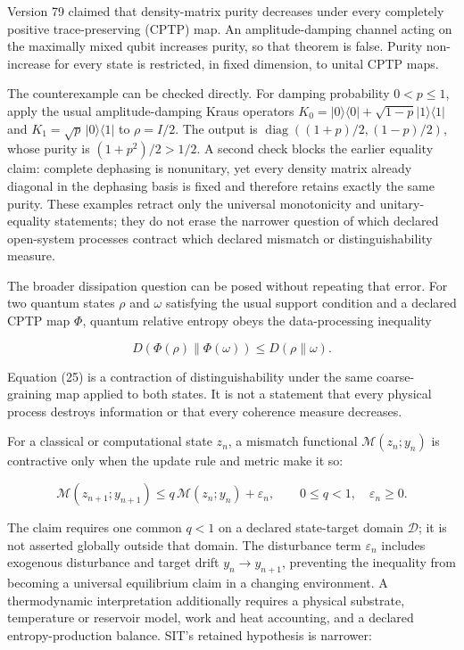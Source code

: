 \documentclass[
  american,
  11pt,
  letterpaper,
]{article}
\begin{document}
Version 79 claimed that density-matrix purity decreases under every completely positive trace-preserving (CPTP) map. An amplitude-damping channel acting on the maximally mixed qubit increases purity, so that theorem is false. Purity non-increase for every state is restricted, in fixed dimension, to unital CPTP maps.

The counterexample can be checked directly. For damping probability \(0<p\leq1\), apply the usual amplitude-damping Kraus operators \(K_0=|0\rangle\langle0|+\sqrt{1-p}|1\rangle\langle1|\) and \(K_1=\sqrt p\,|0\rangle\langle1|\) to \(\rho=I/2\). The output is \(\operatorname{diag}((1+p)/2,(1-p)/2)\), whose purity is \((1+p^2)/2>1/2\). A second check blocks the earlier equality claim: complete dephasing is nonunitary, yet every density matrix already diagonal in the dephasing basis is fixed and therefore retains exactly the same purity. These examples retract only the universal monotonicity and unitary-equality statements; they do not erase the narrower question of which declared open-system processes contract which declared mismatch or distinguishability measure.

The broader dissipation question can be posed without repeating that error. For two quantum states \(\rho\) and \(\omega\) satisfying the usual support condition and a declared CPTP map \(\Phi\), quantum relative entropy obeys the data-processing inequality

\begin{equation}
D\!\left(\Phi(\rho)\middle\|\Phi(\omega)\right)
\le D(\rho\|\omega).
\tag{25}
\end{equation}

Equation (25) is a contraction of distinguishability under the same coarse-graining map applied to both states. It is not a statement that every physical process destroys information or that every coherence measure decreases.

For a classical or computational state \(z_n\), a mismatch functional \(\mathcal M(z_n;y_n)\) is contractive only when the update rule and metric make it so:

\begin{equation}
\mathcal M(z_{n+1};y_{n+1})
\le q\,\mathcal M(z_n;y_n)+\varepsilon_n,
\qquad 0\le q<1,\quad \varepsilon_n\ge0 .
\tag{26}
\end{equation}

The claim requires one common \(q<1\) on a declared state-target domain \(\mathcal D\); it is not asserted globally outside that domain. The disturbance term \(\varepsilon_n\) includes exogenous disturbance and target drift \(y_n\to y_{n+1}\), preventing the inequality from becoming a universal equilibrium claim in a changing environment. A thermodynamic interpretation additionally requires a physical substrate, temperature or reservoir model, work and heat accounting, and a declared entropy-production balance. SIT's retained hypothesis is narrower:
\end{document}
